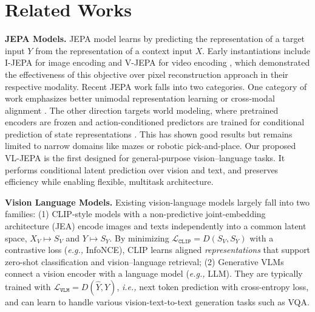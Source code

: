\section{Related Works}
\label{sec:related-works}

\textbf{JEPA Models.}  JEPA model learns by predicting the representation of a target input $Y$ from the representation of a context input $X$. Early instantiations include I-JEPA for image encoding \citep{assran2023self} and V-JEPA for video encoding \citep{bardes2023v}, which demonstrated the effectiveness of this objective over pixel reconstruction approach in their respective modality.
Recent JEPA work falls into two categories. One category of work emphasizes better unimodal representation learning \citep{assran2023self, bardes2023v, fei2023jepa} or cross-modal alignment \citep{lei2025m3, jose2025dinotxt}. 
The other direction targets world modeling, where pretrained encoders are frozen and action-conditioned predictors are trained for conditional prediction of state representations \citep{zhou2025dino,baldassarre2025back,assran2025v,terver2025drives}. This has shown good results but remains limited to narrow domains like mazes or robotic pick-and-place. 
Our proposed VL-JEPA is the first designed for general-purpose vision–language tasks. It performs conditional latent prediction over vision and text, and preserves efficiency while enabling flexible, multitask architecture.


\textbf{Vision Language Models.} Existing vision-language models largely fall into two families: (1) CLIP-style models with a non-predictive joint-embedding architecture (JEA) \citep{radford2021learning, zhai2023sigmoid, bolya2025perception, liu2024remoteclip, chen2023protoclip} encode images and texts independently into a common latent space, $X_V \!\mapsto\! S_V$ and $Y \!\mapsto\! S_Y$. By minimizing $\mathcal{L}_\texttt{CLIP} = D(S_V, S_Y)$ with a contrastive loss (\textit{e.g.,} InfoNCE), CLIP learns aligned \textit{representations} that support zero-shot classification and vision–language retrieval; (2) Generative VLMs \citep{liu2023visual, chen2022pali, dai2023instructblip, alayrac2022flamingo, chen2024visual, cho2025perceptionlm, beyer2024paligemma} connect a vision encoder \citep{radford2021learning,fini2025multimodal} with a language model (\textit{e.g.,} LLM). They are typically trained with $\mathcal{L}_\texttt{VLM} = D(\hat{Y}, Y)$, \textit{i.e.,} next token prediction with cross-entropy loss, and can learn to handle various vision-text-to-text generation tasks such as VQA. 



